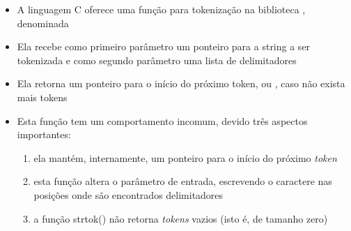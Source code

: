 \begin{frame}[fragile]{}

    \begin{itemize}
        \item A linguagem C oferece uma função para tokenização na biblioteca , 
            denominada 
        \pause

        \item Ela recebe como primeiro parâmetro um ponteiro para a string a ser tokenizada e como 
            segundo parâmetro uma lista de delimitadores
        \pause

        \item Ela retorna um ponteiro para o início do próximo token, ou , caso não 
            exista mais tokens
        \pause

        \item Esta função tem um comportamento incomum, devido três aspectos importantes:
            \begin{enumerate}
        \pause
                \item ela mantém, internamente, um ponteiro para o início do próximo \textit{token}
        \pause
                \item esta função altera o parâmetro de entrada, escrevendo o caractere  nas posições onde são encontrados delimitadores
        \pause
                \item a função strtok() não retorna \textit{tokens} vazios (isto é, de tamanho zero)
            \end{enumerate}
    \end{itemize}

\end{frame}

